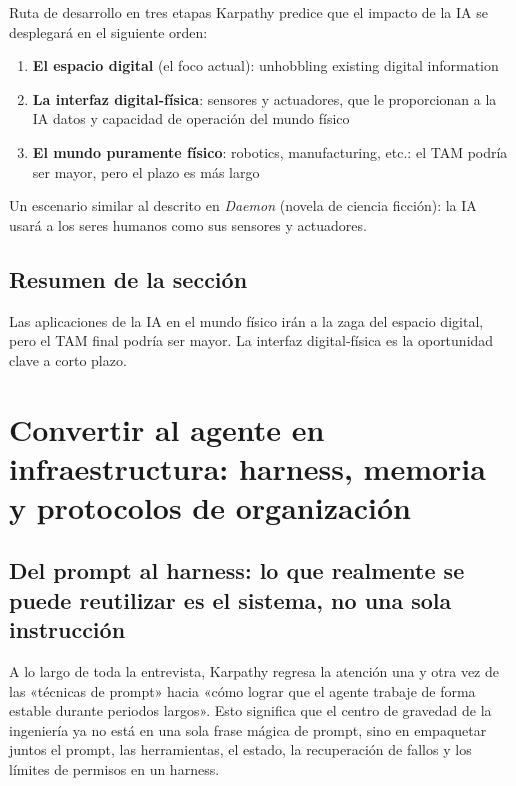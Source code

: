 \documentclass[a4paper]{article}
\begin{document}
\begin{knowledgebox}{Ruta de desarrollo en tres etapas}
Karpathy predice que el impacto de la IA se desplegará en el siguiente orden:
\begin{enumerate}
    \item \textbf{El espacio digital} (el foco actual): unhobbling existing digital information
    \item \textbf{La interfaz digital-física}: sensores y actuadores, que le proporcionan a la IA datos y capacidad de operación del mundo físico
    \item \textbf{El mundo puramente físico}: robotics, manufacturing, etc.: el TAM podría ser mayor, pero el plazo es más largo
\end{enumerate}
Un escenario similar al descrito en \textit{Daemon} (novela de ciencia ficción): la IA usará a los seres humanos como sus sensores y actuadores.
\end{knowledgebox}

\subsection{Resumen de la sección}

Las aplicaciones de la IA en el mundo físico irán a la zaga del espacio digital, pero el TAM final podría ser mayor. La interfaz digital-física es la oportunidad clave a corto plazo.
\section{Convertir al agente en infraestructura: harness, memoria y protocolos de organización}

\subsection{Del prompt al harness: lo que realmente se puede reutilizar es el sistema, no una sola instrucción}
A lo largo de toda la entrevista, Karpathy regresa la atención una y otra vez de las «técnicas de prompt» hacia «cómo lograr que el agente trabaje de forma estable durante periodos largos». Esto significa que el centro de gravedad de la ingeniería ya no está en una sola frase mágica de prompt, sino en empaquetar juntos el prompt, las herramientas, el estado, la recuperación de fallos y los límites de permisos en un harness.
\end{document}

